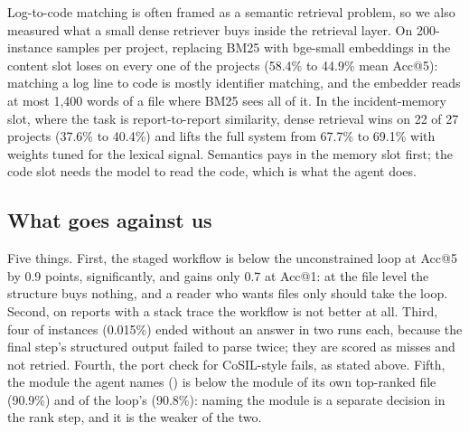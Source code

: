 Log-to-code matching is often framed as a semantic retrieval problem,
so we also measured what a small dense retriever buys inside the
retrieval layer. On
200-instance samples per project, replacing BM25 with bge-small
embeddings in the content slot loses on every one of the \nProjects{}
projects (58.4\% to 44.9\% mean Acc@5): matching a log line to code is
mostly identifier matching, and the embedder reads at most 1,400 words
of a file where BM25 sees all of it. In the incident-memory slot, where
the task is report-to-report similarity, dense retrieval wins on 22 of
27 projects (37.6\% to 40.4\%) and lifts the full system from 67.7\% to
69.1\% with weights tuned for the lexical signal. Semantics pays in the
memory slot first; the code slot needs the model to read the code, which
is what the agent does.

\subsection{What goes against us}
\label{sec:results:negatives}

Five things. First, the staged workflow is below the unconstrained loop at
Acc@5 by 0.9 points, significantly, and gains only 0.7 at Acc@1: at the
file level the structure buys nothing, and a reader who wants files only
should take the loop. Second, on reports with a stack trace the
workflow is not better at all. Third, four of \nEval{} instances
(0.015\%) ended without an answer in two runs each, because the final
step's structured output failed to parse twice; they are scored as
misses and not retried. Fourth, the port check for CoSIL-style fails,
as stated above. Fifth, the module the agent names (\modOne{}) is below
the module of its own top-ranked file (90.9\%) and of the loop's
(90.8\%): naming the module is a separate decision in the rank step,
and it is the weaker of the two.

